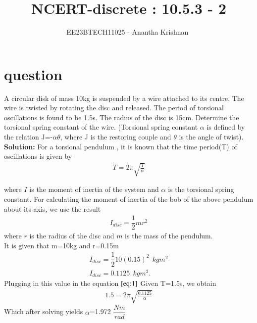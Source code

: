 \documentclass[journal,12pt,twocolumn]{IEEEtran}
\theoremstyle{remark}
\begin{document}

\vspace{3cm}

\title{NCERT-discrete : 10.5.3 - 2}
\author{EE23BTECH11025 - Anantha Krishnan $^{}$%
}
\maketitle
\newpage
\bigskip

\renewcommand{\thefigure}{\theenumi}
\renewcommand{\thetable}{\theenumi}

\section{question}
A circular disk of mass 10kg is suspended by a wire attached to its centre. The wire is twisted by rotating the disc and released. The period of torsional oscillations is found to be 1.5s. The radius of the disc is 15cm. Determine the torsional spring constant of the wire. (Torsional spring constant $\alpha$ is defined by the relation J=-$\alpha$$\theta$, where J is the restoring couple and $\theta$ is the angle of twist).\\

\textbf{Solution:}
For a torsional pendulum , it is known that the time period(T) of oscillations is given by
\begin{align}
T=2\pi\sqrt{\frac{I}{\alpha}}   \label{eq:1}
\end{align}

where $I$ is the moment of inertia of the system and $\alpha$ is the torsional spring constant.
For calculating the moment of inertia of the bob of the above pendulum about its axis, we use the result
\begin{align}
            I_{disc}=\dfrac{1}{2}mr^2
\end{align}
 where $r$ is the radius of the disc and $m$ is the mass of the pendulum.\\
It is given that m=10kg and r=0.15m
\begin{align}
I_{disc}=\dfrac{1}{2}10(0.15)^2 \:\:kgm^2\\
I_{disc}=0.1125\:\: kgm^2.
\end{align}
Plugging in this value in the equation $\eqref{eq:1}$ Given T=1.5s, we obtain
\begin{align}
    1.5=2\pi\sqrt{\frac{0.1125}{\alpha}}
    \end{align}
Which after solving yields $\alpha$=1.972 $\dfrac{Nm}{rad}$
\end{document}
